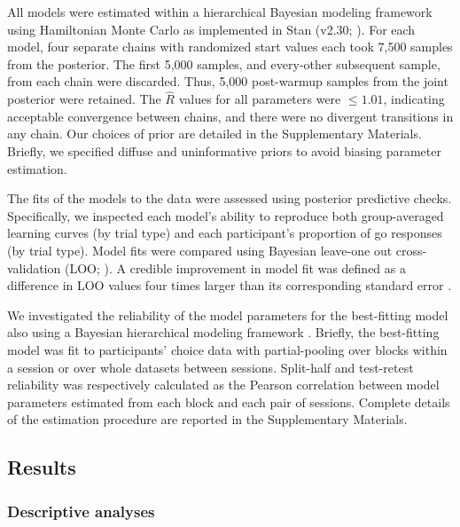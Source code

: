 \documentclass[a4paper,12pt]{article}
\begin{document}
\begin{refsection}[main]
All models were estimated within a hierarchical Bayesian modeling framework using Hamiltonian Monte Carlo as implemented in Stan (v2.30; \cite{carpenter2017stan}). For each model, four separate chains with randomized start values each took 7,500 samples from the posterior. The first 5,000 samples, and every-other subsequent sample, from each chain were discarded. Thus, 5,000 post-warmup samples from the joint posterior were retained. The $\hat{R}$ values for all parameters were $\leq 1.01$, indicating acceptable convergence between chains, and there were no divergent transitions in any chain. Our choices of prior are detailed in the Supplementary Materials. Briefly, we specified diffuse and uninformative priors to avoid biasing parameter estimation.

The fits of the models to the data were assessed using posterior predictive checks. Specifically, we inspected each model's ability to reproduce both group-averaged learning curves (by trial type) and each participant's proportion of go responses (by trial type). Model fits were compared using Bayesian leave-one out cross-validation (LOO; \cite{vehtari2017practical}). A credible improvement in model fit was defined as a difference in LOO values four times larger than its corresponding standard error \cite{Vehtari_undated-tc}.

We investigated the reliability of the model parameters for the best-fitting model also using a Bayesian hierarchical modeling framework \cite{rouder2019psychometrics}. Briefly, the best-fitting model was fit to participants' choice data with partial-pooling over blocks within a session or over whole datasets between sessions. Split-half and test-retest reliability was respectively calculated as the Pearson correlation between model parameters estimated from each block and each pair of sessions. Complete details of the estimation procedure are reported in the Supplementary Materials.

\subsection*{Results}

\subsubsection*{Descriptive analyses}


\end{refsection}
\end{document}
